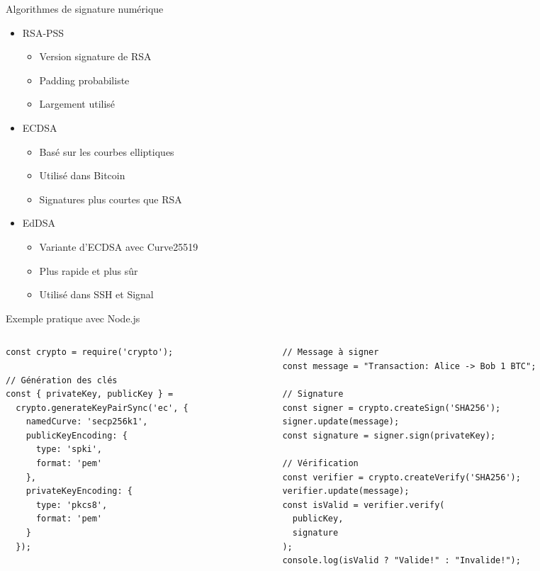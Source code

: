 \begin{frame}{Algorithmes de signature numérique}
  \begin{itemize}
    \item RSA-PSS
      \begin{itemize}
        \item Version signature de RSA
        \item Padding probabiliste
        \item Largement utilisé
      \end{itemize}
    \item ECDSA
      \begin{itemize}
        \item Basé sur les courbes elliptiques
        \item Utilisé dans Bitcoin
        \item Signatures plus courtes que RSA
      \end{itemize}
    \item EdDSA
      \begin{itemize}
        \item Variante d'ECDSA avec Curve25519
        \item Plus rapide et plus sûr
        \item Utilisé dans SSH et Signal
      \end{itemize}
  \end{itemize}
\end{frame}

\begin{frame}[fragile]{Exemple pratique avec Node.js}
  \begin{columns}
    \begin{column}{0.48\textwidth}
      \begin{verbatim}
const crypto = require('crypto');

// Génération des clés
const { privateKey, publicKey } = 
  crypto.generateKeyPairSync('ec', {
    namedCurve: 'secp256k1',
    publicKeyEncoding: {
      type: 'spki',
      format: 'pem'
    },
    privateKeyEncoding: {
      type: 'pkcs8',
      format: 'pem'
    }
  });
      \end{verbatim}
    \end{column}

    \begin{column}{0.48\textwidth}
      \begin{verbatim}
// Message à signer
const message = "Transaction: Alice -> Bob 1 BTC";

// Signature
const signer = crypto.createSign('SHA256');
signer.update(message);
const signature = signer.sign(privateKey);

// Vérification
const verifier = crypto.createVerify('SHA256');
verifier.update(message);
const isValid = verifier.verify(
  publicKey, 
  signature
);
console.log(isValid ? "Valide!" : "Invalide!");
      \end{verbatim}
    \end{column}
  \end{columns}
\end{frame}

